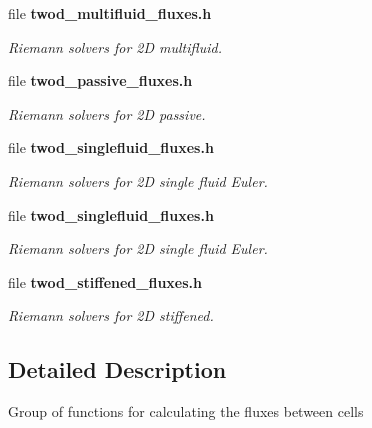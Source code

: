 \begin{DoxyCompactItemize}
file {\bf twod\-\_\-multifluid\-\_\-fluxes.\-h}
\begin{DoxyCompactList}\small\item\em Riemann solvers for 2\-D multifluid. \end{DoxyCompactList}\item 
file {\bf twod\-\_\-passive\-\_\-fluxes.\-h}
\begin{DoxyCompactList}\small\item\em Riemann solvers for 2\-D passive. \end{DoxyCompactList}\item 
file {\bf twod\-\_\-singlefluid\-\_\-fluxes.\-h}
\begin{DoxyCompactList}\small\item\em Riemann solvers for 2\-D single fluid Euler. \end{DoxyCompactList}\item 
file {\bf twod\-\_\-singlefluid\-\_\-fluxes.\-h}
\begin{DoxyCompactList}\small\item\em Riemann solvers for 2\-D single fluid Euler. \end{DoxyCompactList}\item 
file {\bf twod\-\_\-stiffened\-\_\-fluxes.\-h}
\begin{DoxyCompactList}\small\item\em Riemann solvers for 2\-D stiffened. \end{DoxyCompactList}\end{DoxyCompactItemize}


\subsection{Detailed Description}
Group of functions for calculating the fluxes between cells 